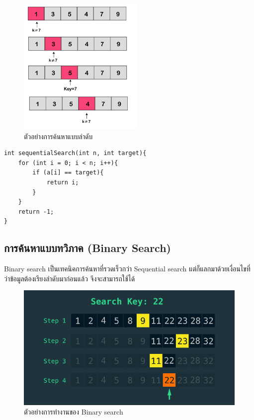 \begin{figure}[h!]
	\centering\includegraphics[width=6cm]{images/sequential_search}
    \caption{ตัวอย่างการค้นหาแบบลำดับ}
    \label{fig:sequential_search}
\end{figure}

\newpage

\begin{lstlisting}
int sequentialSearch(int n, int target){
	for (int i = 0; i < n; i++){
		if (a[i] == target){
			return i;
		}
	}
	return -1;
}
\end{lstlisting}

\subsection{การค้นหาแบบทวิภาค (Binary Search)}

Binary search เป็นเทคนิคการค้นหาที่รวดเร็วกว่า Sequential search แต่ก็แลกมาด้วยเงื่อนไขที่ว่าข้อมูลต้องเรียงลำดับมาก่อนแล้ว จึงจะสามารถใช้ได้

\begin{figure}[h!]
	\centering
    \includegraphics[width=13cm]{images/binary-search}
    \caption{ตัวอย่างการทำงานของ Binary search}
    \label{fig:binary_search}
\end{figure}

